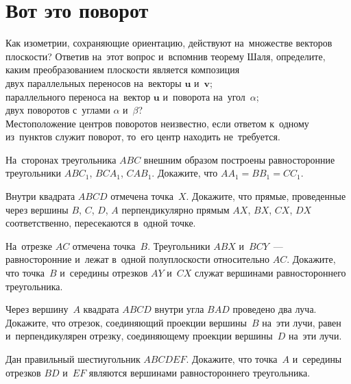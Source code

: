 

\section*{Вот это поворот}


\begin{problems}

\item
Как изометрии, сохраняющие ориентацию, действуют на~множестве векторов
плоскости?
Ответив на~этот вопрос и~вспомнив теорему Шаля, определите, каким
преобразованием плоскости является композиция
\\
\subproblem
двух параллельных переносов на~векторы $\mathbf{u}$ и~$\mathbf{v}$;
\\
\subproblem
параллельного переноса на~вектор $\mathbf{u}$ и~поворота на~угол~$\alpha$;
\\
\subproblem
двух поворотов с~углами $\alpha$ и~$\beta$?
\\
Местоположение центров поворотов неизвестно, если ответом к~одному из~пунктов
служит поворот, то~его центр находить не~требуется.

\item
На~сторонах треугольника $ABC$ внешним образом построены равносторонние
треугольники $A B C_1$, $B C A_1$, $C A B_1$.
Докажите, что $A A_1 = B B_1 = C C_1$.

\item
Внутри квадрата $ABCD$ отмечена точка~$X$.
Докажите, что прямые, проведенные через вершины $B$, $C$, $D$, $A$
перпендикулярно прямым $AX$, $BX$, $CX$, $DX$ соответственно, пересекаются
в~одной точке.

\item
На~отрезке $AC$ отмечена точка~$B$.
Треугольники $ABX$ и~$BCY$~--- равносторонние и~лежат в~одной полуплоскости
относительно $AC$.
Докажите, что точка~$B$ и~середины отрезков $AY$ и~$CX$ служат вершинами
равностороннего треугольника.

\item
Через вершину~$A$ квадрата $ABCD$ внутри угла $BAD$ проведено два луча.
Докажите, что отрезок, соединяющий проекции вершины~$B$ на~эти лучи, равен
и~перпендикулярен отрезку, соединяющему проекции вершины~$D$ на~эти лучи.

\item
Дан правильный шестиугольник $ABCDEF$.
Докажите, что точка~$A$ и~середины отрезков $BD$ и~$EF$ являются вершинами
равностороннего треугольника.


\end{problems}
